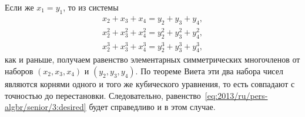 Если же $x_1 = y_1$, то из системы
\begin{gather*}
    x_2 + x_3 + x_4 = y_2 + y_3 + y_4
,\\
    x_2^2 + x_3^2 + x_4^2 = y_2^2 + y_3^2 + y_4^2
,\\
    x_2^3 + x_3^3 + x_4^3 = y_2^3 + y_3^3 + y_4^3
,\end{gather*}
как и раньше, получаем равенство элементарных симметрических многочленов от
наборов $(x_2, x_3, x_4)$ и $(y_2, y_3, y_4)$.
По теореме Виета эти два набора чисел являются корнями одного и того же
кубического уравнения, то есть совпадают с точностью до перестановки.
Следовательно, равенство~\eqref{eq:2013/ru/pers-algbr/senior/3:desired} будет
справедливо и в этом случае.
\endproblem
